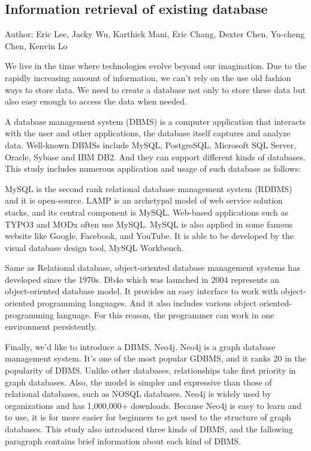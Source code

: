 	
\subsection{Information retrieval of existing database}
Author: Eric Lee, Jacky Wu, Karthick Mani, Eric Chang, Dexter Chen, Yu-cheng Chen, Kenvin Lo

We live in the time where technologies evolve beyond our imagination. Due to the rapidly increasing amount of information, we can't rely on the use old fashion ways to store data. We need to create a database not only to store these data but also easy enough to access the data when needed.

A database management system (DBMS) is a computer  application that interacts with the user and other applications, the database itself  captures and analyze data. Well-known DBMSs include MySQL, PostgreSQL, Microsoft SQL Server, Oracle, Sybase and IBM DB2. And they can support different kinds of databases. This study includes numerous application and usage of such database as follows:

MySQL is the second rank relational database management system (RDBMS) and it is open-source. LAMP is an archetypal model of web service solution stacks, and its central component is MySQL. Web-based applications such as TYPO3 and MODx often use MySQL. MySQL is also applied in some famous website like Google, Facebook, and YouTube. It is able to be developed by the visual database design tool, MySQL Workbench.

Same as Relational database, object-oriented database management systems has developed since the 1970s. Db4o which was launched in 2004 represents an object-oriented database model. It provides an easy interface to work with object-oriented programming languages. And it also includes various object oriented-programming language. For this reason, the programmer can work in one environment persistently.

Finally, we’d like to introduce a DBMS, Neo4j. Neo4j is a graph database management system. It’s one of the most popular GDBMS, and it ranks 20 in the popularity of DBMS. Unlike other databases, relationships take first priority in graph databases. Also, the model is simpler and expressive than those of relational databases, such as NOSQL databases. Neo4j is widely used by organizations and has 1,000,000+ downloads. Because Neo4j is easy to learn and to use, it is for more easier for beginners to get used to the structure of graph databases. This study also introduced three kinds of DBMS, and the fallowing paragraph contains brief information about each kind of DBMS.

